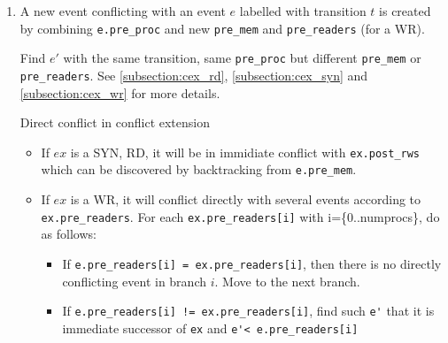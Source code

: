 \documentclass{llncs}
\begin{document}
\begin{enumerate}
\begin{algorithm}{}
\begin{enumerate}
			for each \verb!e.pre_readers[i]! $(i \in [0..numprocs])$,
			
			set \verb!parent = e.pre_readers[i]!
			
		\end{enumerate}
		Let's consider $parent$.
		
		\begin{itemize}
			\item
			\verb!parent->trans->type! is RD or SYN: 
			If found(e') in \verb!parent.post_rws!, then $e$ and $e'$ are in immediate
			conflict
			\item
			\verb!parent->trans->type! is WR: If found(e) and found(e') in the same 
			\verb!parent.post_mem[i]!, then they definitely
			conflict immediately.
		\end{itemize}
		\noindent
		\caption{Check direct conflict between two enabled events}
		\label{a:dicfl}
	\end{algorithm}
	
	\item
	A new event conflicting with an event $e$ labelled with transition $t$ is created by
	combining \verb!e.pre_proc! and new \verb!pre_mem! and \verb!pre_readers! (for a WR).

	Find $e'$ with the same transition, same \verb!pre_proc! but different \verb!pre_mem! or
	\verb!pre_readers!. See \cref{subsection:cex_rd}, \cref{subsection:cex_syn} and \cref{subsection:cex_wr} for more details.
	
	\begin{lemma}{Direct conflict in conflict extension}
		\begin{itemize}
			\item
			If $ex$ is a SYN, RD, it will be in immidiate conflict with \verb!ex.post_rws! which can be discovered by backtracking from \verb!e.pre_mem!.
			\item
			If $ex$ is a WR, it will conflict directly with several events according to \verb|ex.pre_readers|. For each \verb|ex.pre_readers[i]| with i=\{0..numprocs\}, do as follows:
			\begin{itemize}
				\item 
					If \verb|e.pre_readers[i] = ex.pre_readers[i]|, then there is no directly conflicting event in branch $i$. Move to the next branch.
				\item
					If \verb|e.pre_readers[i] != ex.pre_readers[i]|, find such \verb|e'| that it is immediate successor of \verb|ex| and \verb|e'< e.pre_readers[i]|
			\end{itemize}
		\end{itemize}
	\end{lemma}
	
\end{enumerate}
\end{document}
